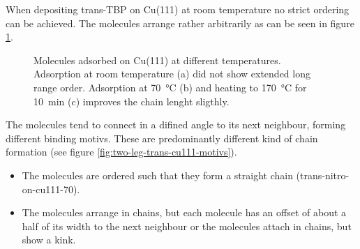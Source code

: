 When depositing trans-TBP on Cu(111) at room temperature no strict ordering can be achieved. The molecules arrange rather arbitrarily as can be seen in figure \ref{fig:two-leg-trans-cu111}.

\begin{figure}[h]
 \centering
\caption{Molecules adsorbed on Cu(111) at different temperatures. Adsorption at room temperature (a) did not show extended long range order. Adsorption at \SI{70}{\celsius} (b) and heating to \SI{170}{\celsius} for \SI{10}{\minute} (c) improves the chain lenght sligthly.}
\label{fig:two-leg-trans-cu111}
\end{figure}

The molecules tend to connect in a difined angle to its next neighbour, forming different binding motivs. These are predominantly different kind of chain formation (see figure \ref{fig:two-leg-trans-cu111-motivs}).
\begin{itemize}
 \item The molecules are ordered such that they form a straight chain (trans-nitro-on-cu111-70).
 \item The molecules arrange in chains, but each molecule has an offset of about a half of its width to the next neighbour or the molecules attach in chains, but show a kink.
\end{itemize}

